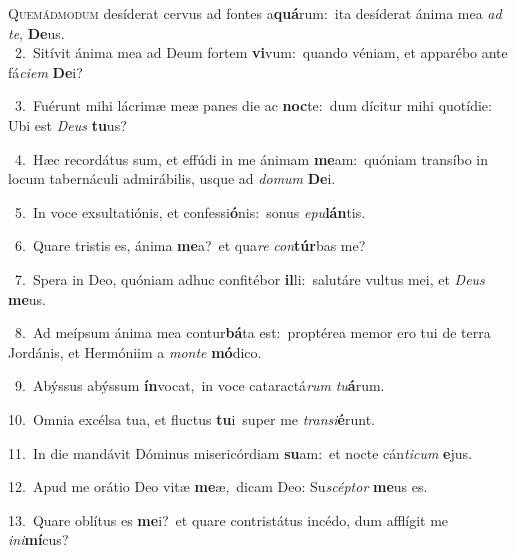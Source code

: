 \lettrine{\initial\textcolor{\initialcolor}{Q}}{uemádmodum} desíderat cervus ad fontes a\-\textbf{quá}\-rum:~\star ita desíderat ánima mea \textit{ad} \textit{te}\-, \textbf{De}\-us.\\
{\numbfont\textcolor{\numbcolor}{~2.}}~Sitívit ánima mea ad Deum fortem \textbf{vi}\-vum:~\star quando véniam, et apparébo ante fá\-\textit{ci}\-\textit{em} \textbf{De}\-i?\par
{\numbfont\textcolor{\numbcolor}{~3.}}~Fuérunt mihi lácrimæ meæ panes die ac \textbf{noc}\-te:~\star dum dícitur mihi quotídie: Ubi est \textit{De}\-\textit{us} \textbf{tu}\-us?\par
{\numbfont\textcolor{\numbcolor}{~4.}}~Hæc recordátus sum, et effúdi in me ánimam \textbf{me}\-am:~\star quóniam transíbo in locum tabernáculi admirábilis, usque ad \textit{do}\-\textit{mum} \textbf{De}\-i.\par
{\numbfont\textcolor{\numbcolor}{~5.}}~In voce exsultatiónis, et confessi\-\textbf{ó}\-nis:~\star sonus \textit{e}\-\textit{pu}\textbf{lán}tis.\par
{\numbfont\textcolor{\numbcolor}{~6.}}~Quare tristis es, ánima \textbf{me}\-a?~\star et qua\textit{re} \textit{con}\-\textbf{túr}bas me?\par
{\numbfont\textcolor{\numbcolor}{~7.}}~Spera in Deo, quóniam adhuc confitébor \textbf{il}\-li:~\star salutáre vultus mei, et \textit{De}\-\textit{us} \textbf{me}\-us.\par
{\numbfont\textcolor{\numbcolor}{~8.}}~Ad meípsum ánima mea contur\-\textbf{bá}\-ta est:~\star proptérea memor ero tui de terra Jordánis, et Hermóniim a \textit{mon}\-\textit{te} \textbf{mó}\-dico.\par
{\numbfont\textcolor{\numbcolor}{~9.}}~Abýssus abýssum \textbf{ín}\-vocat,~\star in voce cataractá\textit{rum} \textit{tu}\-\textbf{á}rum.\par
{\numbfont\textcolor{\numbcolor}{10.}}~Omnia excélsa tua, et fluctus \textbf{tu}\-i~\star super me \textit{trans}\-\textit{i}\textbf{é}runt.\par
{\numbfont\textcolor{\numbcolor}{11.}}~In die mandávit Dóminus misericórdiam \textbf{su}\-am:~\star et nocte cán\-\textit{ti}\-\textit{cum} \textbf{e}\-jus.\par
{\numbfont\textcolor{\numbcolor}{12.}}~Apud me orátio Deo vitæ \textbf{me}\-æ,~\star dicam Deo: Su\-\textit{scép}\-\textit{tor} \textbf{me}\-us es.\par
{\numbfont\textcolor{\numbcolor}{13.}}~Quare oblítus es \textbf{me}\-i?~\star et quare contristátus incédo, dum afflígit me \textit{in}\-\textit{i}\textbf{mí}cus?\par
